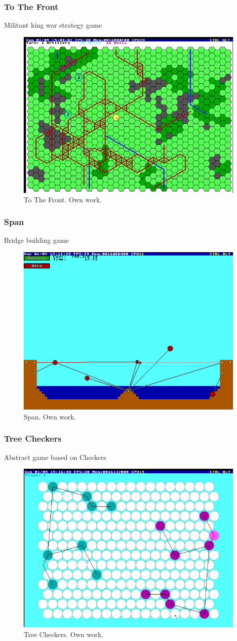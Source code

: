 \documentclass{beamer}
\begin{document}
	\begin{frame}
		\frametitle{To The Front}
		Militant king war strategy game
		\begin{figure}
			\centering
			\includegraphics[width=0.6\linewidth]{images/to_the_front.png}
			\caption{To The Front. Own work.}
			\label{fig:to_the_front}
		\end{figure}
	\end{frame}

	\begin{frame}
		\frametitle{Span}
		Bridge building game
		\begin{figure}
			\centering
			\includegraphics[width=0.6\linewidth]{images/span.png}
			\caption{Span. Own work.}
			\label{fig:span}
		\end{figure}
	\end{frame}

	\begin{frame}
		\frametitle{Tree Checkers}
		Abstract game based on Checkers
		\begin{figure}
			\centering
			\includegraphics[width=0.6\linewidth]{images/tree_checkers.png}
			\caption{Tree Checkers. Own work.}
			\label{fig:tree_checkers}
		\end{figure}
	\end{frame}
\end{document}
